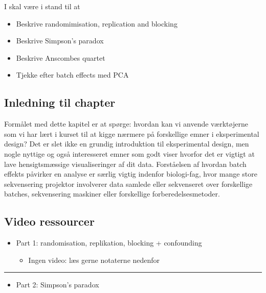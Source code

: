 \documentclass[
]{book}
\providecommand{\tightlist}{%
  \setlength{\itemsep}{0pt}\setlength{\parskip}{0pt}}
\begin{document}
I skal være i stand til at

\begin{itemize}
\tightlist
\item
  Beskrive randomimisation, replication and blocking
\item
  Beskrive Simpson's paradox
\item
  Beskrive Anscombes quartet
\item
  Tjekke efter batch effects med PCA
\end{itemize}

\hypertarget{inledning-til-chapter-1}{%
\subsection{Inledning til chapter}\label{inledning-til-chapter-1}}

Formålet med dette kapitel er at spørge: hvordan kan vi anvende værktøjerne som vi har lært i kurset til at kigge nærmere på forskellige emner i eksperimental design? Det er slet ikke en grundig introduktion til eksperimental design, men nogle nyttige og også interesseret emner som godt viser hvorfor det er vigtigt at lave hensigtsmæssige visualiseringer af dit data. Forståelsen af hvordan batch effekts påvirker en analyse er særlig vigtig indenfor biologi-fag, hvor mange store sekvensering projektor involverer data samlede eller sekvenseret over forskellige batches, sekvensering maskiner eller forskellige forberedelsesmetoder.

\hypertarget{video-ressourcer-7}{%
\subsection{Video ressourcer}\label{video-ressourcer-7}}

\begin{itemize}
\tightlist
\item
  Part 1: randomisation, replikation, blocking + confounding

  \begin{itemize}
  \tightlist
  \item
    Ingen video: læs gerne notaterne nedenfor
  \end{itemize}
\end{itemize}

\begin{center}\rule{0.5\linewidth}{0.5pt}\end{center}

\begin{itemize}
\tightlist
\item
  Part 2: Simpson's paradox
\end{itemize}
\end{document}
